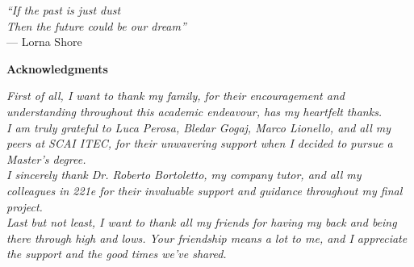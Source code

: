\begin{flushright}{
    \slshape
    ``If the past is just dust\\ Then the future could be our dream''} \\
    \medskip
    --- Lorna Shore 
\end{flushright}

\bigskip
\bigskip

\begin{center}
    \textbf{\huge Acknowledgments}
\end{center}
\bigskip

\noindent \textit{First of all, I want to thank my family, for their encouragement and understanding throughout this academic endeavour, has my heartfelt thanks.}\\
\noindent \textit{I am truly grateful to Luca Perosa, Bledar Gogaj, Marco Lionello, and all my peers at SCAI ITEC, for their unwavering support when I decided to pursue a Master’s degree.}\\
\noindent \textit{I sincerely thank Dr. Roberto Bortoletto, my company tutor, and all my colleagues in 221e for their invaluable support and guidance throughout my final project.}\\
\noindent \textit{Last but not least, I want to thank all my friends for having my back and being there through high and lows. Your friendship means a lot to me, and I appreciate the support and the good times we've shared.}\\
\bigskip
{}